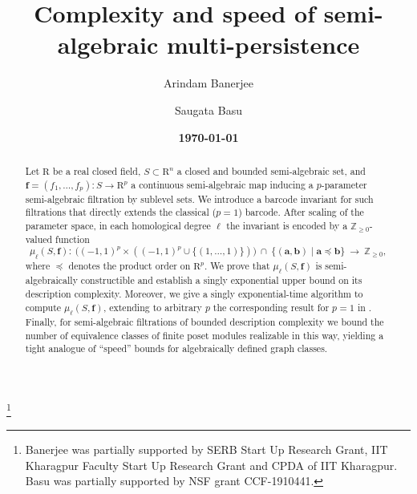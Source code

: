 \documentclass{amsart}[10pts]
\theoremstyle{definition}
\theoremstyle{remark}
\theoremstyle{observation}
\numberwithin{equation}{section}
\newcommand {\R} {\mathrm{R}}
\newcommand {\Z}  {\mathbb{Z}}
\begin{document}
\title[Complexity and speed of semi-algebraic multi-persistence]
{
Complexity and speed of semi-algebraic multi-persistence
}
\author{Arindam Banerjee}
\address{Department of Mathematics, 
IIT Kharagpur, Kharagpur, India.}

\author{Saugata Basu}
\address{Department of Mathematics,
Purdue University, West Lafayette, IN 47906, U.S.A.}



\date{\textbf{\today}}
\thanks{
Banerjee was partially supported by SERB Start Up Research Grant, IIT Kharagpur Faculty Start Up Research Grant and CPDA of IIT Kharagpur.
Basu was  partially supported by NSF grant
CCF-1910441. }
\begin{abstract}
Let $\R$ be a real closed field, $S \subset \R^n$ a closed and bounded semi-algebraic set, and $\mathbf{f}=(f_1,\ldots,f_p):S \rightarrow \R^p$ a continuous semi-algebraic map inducing a $p$-parameter semi-algebraic filtration by sublevel sets. 
We introduce a barcode invariant for such filtrations that directly extends the classical ($p=1$) barcode. 
After 
scaling of the parameter space, in each homological degree $\ell$ the invariant is encoded by a $\Z_{\ge 0}$-valued
function
\[
\mu_\ell(S,\mathbf{f}):\ 
\Big(({-}1,1)^p\times(({-}1,1)^p \cup\{(1,\ldots,1)\}) \Big)\ \cap\ \{(\mathbf a,\mathbf b)\mid \mathbf a\preceq \mathbf b\}
\ \longrightarrow\ \Z_{\ge 0},
\]
where $\preceq$ denotes the product order on $\R^p$.
We prove that $\mu_\ell(S,\mathbf{f})$ is semi-algebraically constructible and establish a singly exponential upper bound on its description complexity. 
Moreover, we give a singly exponential-time algorithm to compute $\mu_\ell(S,\mathbf{f})$, extending to arbitrary $p$ the corresponding result for $p=1$ in \cite{Basu-Karisani-2}. 
Finally, for semi-algebraic filtrations of bounded description complexity we bound the number of equivalence classes of finite poset modules realizable in this way, yielding a tight analogue of ``speed'' bounds for algebraically defined graph classes.
\end{abstract}
\maketitle
\end{document}

